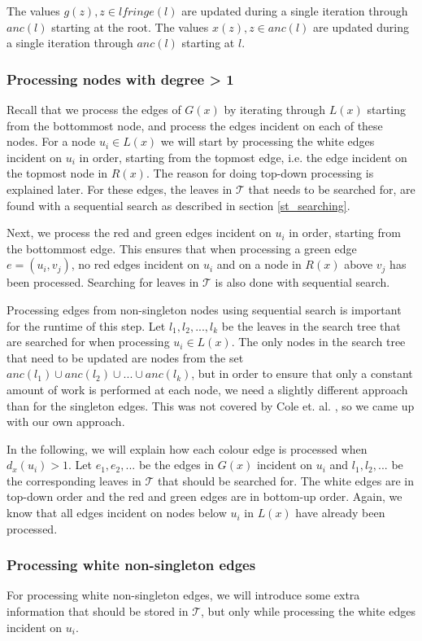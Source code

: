The values $g(z), z \in lfringe(l)$ are updated during a single iteration through $anc(l)$ starting at the root. The values $x(z), z \in anc(l)$ are updated during a single iteration through $anc(l)$ starting at $l$.

\subsubsection{Processing nodes with degree > 1}
Recall that we process the edges of $G(x)$ by iterating through $L(x)$ starting from the bottommost node, and process the edges incident on each of these nodes. For a node $u_i \in L(x)$ we will start by processing the white edges incident on $u_i$ in order, starting from the topmost edge, i.e. the edge incident on the topmost node in $R(x)$. The reason for doing top-down processing is explained later. For these edges, the leaves in $\mathcal{T}$ that needs to be searched for, are found with a sequential search as described in section \ref{st_searching}.

Next, we process the red and green edges incident on $u_i$ in order, starting from the bottommost edge. This ensures that when processing a green edge $e=(u_i,v_j)$, no red edges incident on $u_i$ and on a node in $R(x)$ above $v_j$ has been processed. Searching for leaves in $\mathcal{T}$ is also done with sequential search.

Processing edges from non-singleton nodes using sequential search is important for the runtime of this step. Let ${l_1, l_2, ..., l_k}$ be the leaves in the search tree that are searched for when processing $u_i \in L(x)$. The only nodes in the search tree that need to be updated are nodes from the set ${anc(l_1) \cup anc(l_2) \cup ... \cup anc(l_k)}$, but in order to ensure that only a constant amount of work is performed at each node, we need a slightly different approach than for the singleton edges. This was not covered by Cole et. al. \cite{nlogn}, so we came up with our own approach.

In the following, we will explain how each colour edge is processed when $d_x(u_i) > 1$. Let $e_1, e_2, ...$ be the edges in $G(x)$ incident on $u_i$ and $l_1, l_2, ...$ be the corresponding leaves in $\mathcal{T}$ that should be searched for. The white edges are in top-down order and the red and green edges are in bottom-up order. Again, we know that all edges incident on nodes below $u_i$ in $L(x)$ have already been processed.

\subsubsection{Processing white non-singleton edges}
For processing white non-singleton edges, we will introduce some extra information that should be stored in $\mathcal{T}$, but only while processing the white edges incident on $u_i$.

